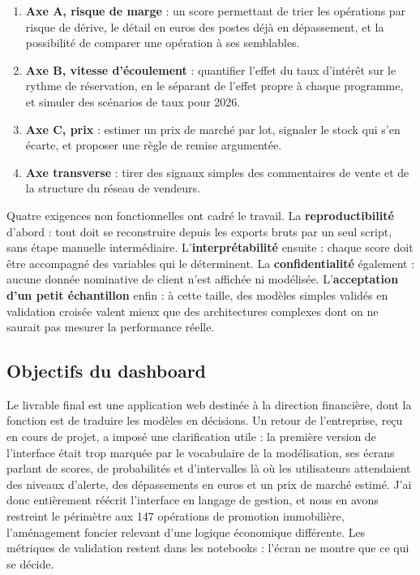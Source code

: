 \begin{enumerate}
\def\labelenumi{\arabic{enumi}.}

\item
  \textbf{Axe A, risque de marge} : un score permettant de trier les opérations par risque de
  dérive, le détail en euros des postes déjà en dépassement, et la possibilité de
  comparer une opération à ses semblables.
\item
  \textbf{Axe B, vitesse d'écoulement} : quantifier l'effet du taux d'intérêt sur le rythme de
  réservation, en le séparant de l'effet propre à chaque programme, et simuler des
  scénarios de taux pour 2026.
\item
  \textbf{Axe C, prix} : estimer un prix de marché par lot, signaler le stock qui s'en écarte,
  et proposer une règle de remise argumentée.
\item
  \textbf{Axe transverse} : tirer des signaux simples des commentaires de vente et de la
  structure du réseau de vendeurs.
\end{enumerate}

Quatre exigences non fonctionnelles ont cadré le travail. La \textbf{reproductibilité} d'abord : tout
doit se reconstruire depuis les exports bruts par un seul script, sans étape manuelle
intermédiaire. L'\textbf{interprétabilité} ensuite : chaque score doit être accompagné des variables
qui le déterminent. La \textbf{confidentialité} également : aucune donnée nominative de client n'est
affichée ni modélisée. L'\textbf{acceptation d'un petit échantillon} enfin : à cette taille, des
modèles simples validés en validation croisée valent mieux que des architectures complexes dont
on ne saurait pas mesurer la performance réelle.

\hypertarget{objectifs-du-dashboard}{%
\subsection{Objectifs du dashboard}\label{objectifs-du-dashboard}}

Le livrable final est une application web destinée à la direction financière, dont la fonction
est de traduire les modèles en décisions. Un retour de l'entreprise, reçu en cours de projet,
a imposé une clarification utile : la première version de l'interface était trop marquée par le
vocabulaire de la modélisation, ses écrans parlant de scores, de probabilités et
d'intervalles là où les utilisateurs attendaient des niveaux d'alerte, des dépassements en
euros et un prix de marché estimé. J'ai donc entièrement réécrit l'interface en langage de
gestion, et nous en avons restreint le périmètre aux 147 opérations de promotion immobilière,
l'aménagement foncier relevant d'une logique économique différente. Les métriques de validation
restent dans les notebooks : l'écran ne montre que ce qui se décide.

